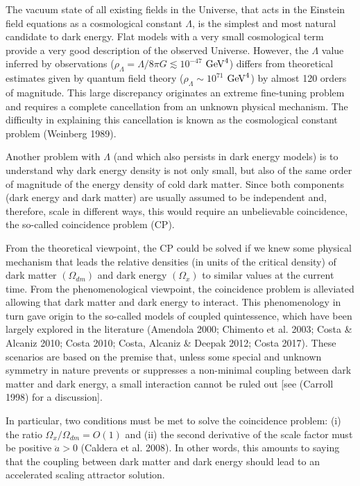 \documentclass[twocolumn,preprintnumbers,amsmath,amssymb]{revtex4}
\begin{document}
The vacuum state of all existing fields in the Universe, that acts in the Einstein field equations as a 
cosmological constant $\Lambda$, is the simplest and most natural candidate to dark energy. Flat models with 
a very small cosmological term provide a very good description of the observed Universe. However, the $\Lambda$ 
value inferred by observations ($\rho_{\Lambda} = \Lambda/8\pi G \lesssim 10^{-47}$ ${\rm{GeV}}^4$) differs from 
theoretical estimates given by quantum field theory ($\rho_{\Lambda}  \sim 10^{71}$ ${\rm{GeV}}^4$) by almost 
120 orders of magnitude. This large discrepancy originates an extreme fine-tuning problem and requires a 
complete cancellation from an unknown physical mechanism. The difficulty in explaining this cancellation is 
known as the cosmological constant problem (Weinberg 1989).

Another problem with $\Lambda$ (and which also persists in dark energy models) is to understand why dark energy 
density is not only small, but also of the same
order of magnitude of the energy density of cold dark matter. Since both components 
(dark energy and dark matter) are usually assumed to
be independent and, therefore, scale in different ways, this would require an unbelievable coincidence, 
the so-called coincidence problem (CP).

From the theoretical viewpoint, the CP could be solved if we knew some physical mechanism that leads the relative 
densities (in units of the critical density) of dark
matter $(\Omega_{dm})$ and dark energy $(\Omega_{x})$ to similar values at the current time.
From the phenomenological viewpoint, the coincidence problem is alleviated allowing that dark matter and 
dark energy to interact. This phenomenology in turn gave origin
to the so-called models of coupled quintessence, which have been largely explored in the literature (Amendola 2000; Chimento et al. 2003; Costa \& Alcaniz 2010; Costa 2010; Costa, Alcaniz \& Deepak 2012; Costa 2017). These scenarios 
are based on the premise that, unless some special and unknown symmetry in nature prevents or 
suppresses a non-minimal coupling between dark matter and dark energy,
a small interaction cannot be ruled out [see (Carroll 1998) for a discussion].

In particular, two conditions must be met to solve the coincidence problem: (i) the ratio 
$\Omega_{x}/ \Omega_{dm} = O(1)$ and (ii) the second derivative of
the scale factor must be positive $\ddot{a} > 0$ (Caldera et al. 2008). In other words, this amounts to saying that the coupling between dark matter and dark energy should lead to an accelerated scaling attractor solution.
\end{document}
